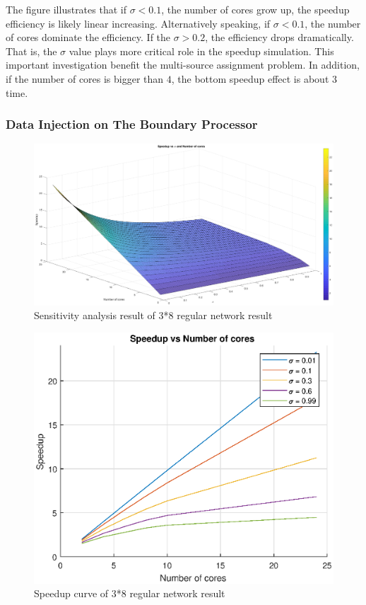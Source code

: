 The figure illustrates that if $\sigma < 0.1$, the number of cores grow up, the speedup efficiency is likely linear increasing.   Alternatively speaking, if $\sigma < 0.1$, the number of cores dominate the efficiency.   If the $\sigma > 0.2$, the efficiency drops dramatically.   That is, the $\sigma$ value plays more critical role in the speedup simulation.   This important investigation benefit the multi-source assignment problem.   In addition, if the number of cores is bigger than $4$, the bottom speedup effect is about $3$ time.   
\newpage

\subsubsection{Data Injection on The Boundary Processor}

\begin{figure}[!ht]
\centering
\includegraphics[width=1\columnwidth]{figure/sa3t8b_no.eps}
\caption{Sensitivity analysis result of 3*8 regular network result}
\label{fig:sa3t8b_no}
\end{figure}

\begin{figure}[!ht]
\centering
\includegraphics[width=1\columnwidth]{figure/sa3t8b_no_curve.eps}
\caption{Speedup curve of 3*8 regular network result}
\label{fig:sa3t8b_no_curve}
\end{figure}

